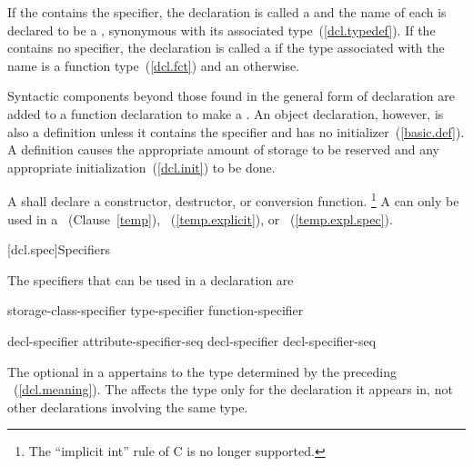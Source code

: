 \pnum
If the  contains the 
specifier, the declaration is called a  and the name
of each 
is declared to be a , synonymous with its
associated type~(\ref{dcl.typedef}). If the
 contains no  specifier, the
declaration is called a  if
the type associated with the name is a function type~(\ref{dcl.fct}) and
an  otherwise.

\pnum
{}%
Syntactic components beyond those found in the general form of
declaration are added to a function declaration to make a
. An object declaration, however, is also
a definition unless it contains the  specifier and has no
initializer~(\ref{basic.def}).
%
A
definition causes the appropriate amount of storage to be reserved and
any appropriate initialization~(\ref{dcl.init}) to be done.

\pnum
A  shall declare a
constructor, destructor, or conversion function.  \footnote{The
``implicit int'' rule of C is no longer supported.}
\enternote
A  can only be used in a
~(Clause~\ref{temp}),
~(\ref{temp.explicit}), or
~(\ref{temp.expl.spec}).
\exitnote

[dcl.spec]{Specifiers}%

\pnum
{}%
The specifiers that can be used in a declaration are

\begin{bnf}
\br
    storage-class-specifier\br
    type-specifier\br
    function-specifier\br
    \br
    \br
\end{bnf}

\begin{bnf}
\br
    decl-specifier attribute-specifier-seq\opt\br
    decl-specifier decl-specifier-seq
\end{bnf}

The optional  in a 
appertains to the type determined by the preceding
~(\ref{dcl.meaning}). The 
affects the type only for the declaration it appears in, not other declarations involving the
same type.

